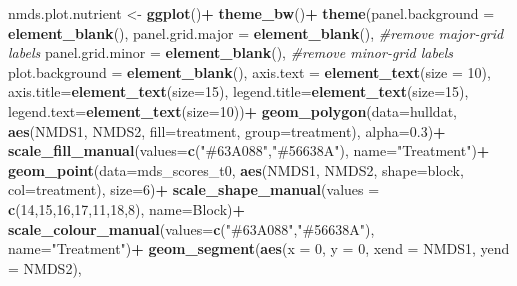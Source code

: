 \documentclass[
]{article}
\newenvironment{Shaded}{\begin{snugshade}}{\end{snugshade}}
\newcommand{\AttributeTok}[1]{\textcolor[rgb]{0.13,0.29,0.53}{#1}}
\newcommand{\CommentTok}[1]{\textcolor[rgb]{0.56,0.35,0.01}{\textit{#1}}}
\newcommand{\DecValTok}[1]{\textcolor[rgb]{0.00,0.00,0.81}{#1}}
\newcommand{\FloatTok}[1]{\textcolor[rgb]{0.00,0.00,0.81}{#1}}
\newcommand{\FunctionTok}[1]{\textcolor[rgb]{0.13,0.29,0.53}{\textbf{#1}}}
\newcommand{\NormalTok}[1]{#1}
\newcommand{\OtherTok}[1]{\textcolor[rgb]{0.56,0.35,0.01}{#1}}
\newcommand{\SpecialCharTok}[1]{\textcolor[rgb]{0.81,0.36,0.00}{\textbf{#1}}}
\newcommand{\StringTok}[1]{\textcolor[rgb]{0.31,0.60,0.02}{#1}}
\begin{document}
\begin{Shaded}
\begin{Highlighting}[]
\NormalTok{nmds.plot.nutrient }\OtherTok{\textless{}{-}} \FunctionTok{ggplot}\NormalTok{()}\SpecialCharTok{+}
  \FunctionTok{theme\_bw}\NormalTok{()}\SpecialCharTok{+}
  \FunctionTok{theme}\NormalTok{(}\AttributeTok{panel.background =} \FunctionTok{element\_blank}\NormalTok{(),}
        \AttributeTok{panel.grid.major =} \FunctionTok{element\_blank}\NormalTok{(),  }\CommentTok{\#remove major{-}grid labels}
        \AttributeTok{panel.grid.minor =} \FunctionTok{element\_blank}\NormalTok{(),  }\CommentTok{\#remove minor{-}grid labels}
        \AttributeTok{plot.background =} \FunctionTok{element\_blank}\NormalTok{(), }
        \AttributeTok{axis.text =} \FunctionTok{element\_text}\NormalTok{(}\AttributeTok{size =} \DecValTok{10}\NormalTok{),}
        \AttributeTok{axis.title=}\FunctionTok{element\_text}\NormalTok{(}\AttributeTok{size=}\DecValTok{15}\NormalTok{),}
        \AttributeTok{legend.title=}\FunctionTok{element\_text}\NormalTok{(}\AttributeTok{size=}\DecValTok{15}\NormalTok{), }
        \AttributeTok{legend.text=}\FunctionTok{element\_text}\NormalTok{(}\AttributeTok{size=}\DecValTok{10}\NormalTok{))}\SpecialCharTok{+}
  \FunctionTok{geom\_polygon}\NormalTok{(}\AttributeTok{data=}\NormalTok{hulldat, }\FunctionTok{aes}\NormalTok{(NMDS1, NMDS2, }\AttributeTok{fill=}\NormalTok{treatment, }\AttributeTok{group=}\NormalTok{treatment), }\AttributeTok{alpha=}\FloatTok{0.3}\NormalTok{)}\SpecialCharTok{+}
  \FunctionTok{scale\_fill\_manual}\NormalTok{(}\AttributeTok{values=}\FunctionTok{c}\NormalTok{(}\StringTok{"\#63A088"}\NormalTok{,}\StringTok{"\#56638A"}\NormalTok{), }\AttributeTok{name=}\StringTok{"Treatment"}\NormalTok{)}\SpecialCharTok{+}
  \FunctionTok{geom\_point}\NormalTok{(}\AttributeTok{data=}\NormalTok{mds\_scores\_t0, }\FunctionTok{aes}\NormalTok{(NMDS1, NMDS2, }\AttributeTok{shape=}\NormalTok{block, }\AttributeTok{col=}\NormalTok{treatment), }\AttributeTok{size=}\DecValTok{6}\NormalTok{)}\SpecialCharTok{+} 
  \FunctionTok{scale\_shape\_manual}\NormalTok{(}\AttributeTok{values =} \FunctionTok{c}\NormalTok{(}\DecValTok{14}\NormalTok{,}\DecValTok{15}\NormalTok{,}\DecValTok{16}\NormalTok{,}\DecValTok{17}\NormalTok{,}\DecValTok{11}\NormalTok{,}\DecValTok{18}\NormalTok{,}\DecValTok{8}\NormalTok{), }\AttributeTok{name=}\StringTok{\textquotesingle{}Block\textquotesingle{}}\NormalTok{)}\SpecialCharTok{+}
  \FunctionTok{scale\_colour\_manual}\NormalTok{(}\AttributeTok{values=}\FunctionTok{c}\NormalTok{(}\StringTok{"\#63A088"}\NormalTok{,}\StringTok{"\#56638A"}\NormalTok{), }\AttributeTok{name=}\StringTok{"Treatment"}\NormalTok{)}\SpecialCharTok{+}
  \FunctionTok{geom\_segment}\NormalTok{(}\FunctionTok{aes}\NormalTok{(}\AttributeTok{x =} \DecValTok{0}\NormalTok{, }\AttributeTok{y =} \DecValTok{0}\NormalTok{, }\AttributeTok{xend =}\NormalTok{ NMDS1, }\AttributeTok{yend =}\NormalTok{ NMDS2), }

\end{Highlighting}
\end{Shaded}
\end{document}
